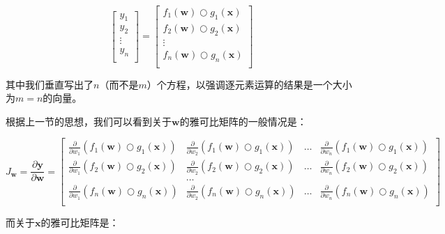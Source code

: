 \documentclass[11pt]{article}
\begin{document}
\[
\begin{bmatrix}
           y_1\\
           y_2\\
           \vdots \\
           y_n\\
           \end{bmatrix} = \begin{bmatrix}
           f_{1}(\mathbf{w}) \bigcirc g_{1}(\mathbf{x})\\
           f_{2}(\mathbf{w}) \bigcirc g_{2}(\mathbf{x})\\
           \vdots \\
           f_{n}(\mathbf{w}) \bigcirc g_{n}(\mathbf{x})\\
         \end{bmatrix}
\]

其中我们垂直写出了$n$（而不是$m$）个方程，以强调逐元素运算的结果是一个大小为$m=n$的向量。

根据上一节的思想，我们可以看到关于$\mathbf{w}$的雅可比矩阵的一般情况是：

\[
J_\mathbf{w} = 
\frac{\partial \mathbf{y}}{\partial \mathbf{w}}  = \begin{bmatrix}
\frac{\partial}{\partial w_1} ( f_{1}(\mathbf{w}) \bigcirc g_{1}(\mathbf{x}) ) & \frac{\partial}{\partial w_2} ( f_{1}(\mathbf{w}) \bigcirc g_{1}(\mathbf{x}) ) & \ldots & \frac{\partial}{\partial w_n} ( f_{1}(\mathbf{w}) \bigcirc g_{1}(\mathbf{x}) )\\
\frac{\partial}{\partial w_1} ( f_{2}(\mathbf{w}) \bigcirc g_{2}(\mathbf{x}) ) & \frac{\partial}{\partial w_2} ( f_{2}(\mathbf{w}) \bigcirc g_{2}(\mathbf{x}) ) & \ldots & \frac{\partial}{\partial w_n} ( f_{2}(\mathbf{w}) \bigcirc g_{2}(\mathbf{x}) )\\
& \ldots\\
\frac{\partial}{\partial w_1} ( f_{n}(\mathbf{w}) \bigcirc g_{n}(\mathbf{x}) ) & \frac{\partial}{\partial w_2} ( f_{n}(\mathbf{w}) \bigcirc g_{n}(\mathbf{x}) ) & \ldots & \frac{\partial}{\partial w_n} ( f_{n}(\mathbf{w}) \bigcirc g_{n}(\mathbf{x}) )\\
\end{bmatrix}
\]

而关于$\mathbf{x}$的雅可比矩阵是：
\end{document}
